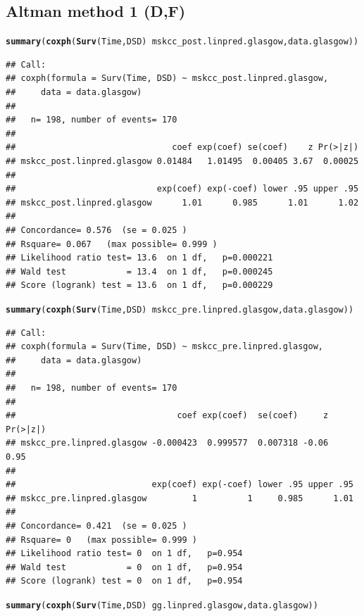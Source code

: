 \documentclass{article}\usepackage[]{graphicx}\usepackage[]{color}
\makeatletter
\newcommand{\hlopt}[1]{\textcolor[rgb]{0,0,0}{#1}}%
\newcommand{\hlstd}[1]{\textcolor[rgb]{0.345,0.345,0.345}{#1}}%
\newcommand{\hlkwd}[1]{\textcolor[rgb]{0.737,0.353,0.396}{\textbf{#1}}}%
\newenvironment{kframe}{%
 \def\at@end@of@kframe{}%
 \ifinner\ifhmode%
  \def\at@end@of@kframe{\end{minipage}}%
  \begin{minipage}{\columnwidth}%
 \fi\fi%
 \def\FrameCommand##1{\hskip\@totalleftmargin \hskip-\fboxsep
 \colorbox{shadecolor}{##1}\hskip-\fboxsep
     \hskip-\linewidth \hskip-\@totalleftmargin \hskip\columnwidth}%
 \MakeFramed {\advance\hsize-\width
   \@totalleftmargin\z@ \linewidth\hsize
   \@setminipage}}%
 {\par\unskip\endMakeFramed%
 \at@end@of@kframe}
\newenvironment{knitrout}{}{} %
\makeatother
\begin{document}
\subsection{Altman method 1 (D,F)}
\begin{knitrout}
\color{fgcolor}\begin{kframe}
\begin{alltt}
\hlkwd{summary}\hlstd{(}\hlkwd{coxph}\hlstd{(}\hlkwd{Surv}\hlstd{(Time, DSD)} \hlopt{~} \hlstd{mskcc_post.linpred.glasgow, data.glasgow))}
\end{alltt}
\begin{verbatim}
## Call:
## coxph(formula = Surv(Time, DSD) ~ mskcc_post.linpred.glasgow, 
##     data = data.glasgow)
## 
##   n= 198, number of events= 170 
## 
##                               coef exp(coef) se(coef)    z Pr(>|z|)
## mskcc_post.linpred.glasgow 0.01484   1.01495  0.00405 3.67  0.00025
## 
##                            exp(coef) exp(-coef) lower .95 upper .95
## mskcc_post.linpred.glasgow      1.01      0.985      1.01      1.02
## 
## Concordance= 0.576  (se = 0.025 )
## Rsquare= 0.067   (max possible= 0.999 )
## Likelihood ratio test= 13.6  on 1 df,   p=0.000221
## Wald test            = 13.4  on 1 df,   p=0.000245
## Score (logrank) test = 13.6  on 1 df,   p=0.000229
\end{verbatim}
\begin{alltt}
\hlkwd{summary}\hlstd{(}\hlkwd{coxph}\hlstd{(}\hlkwd{Surv}\hlstd{(Time, DSD)} \hlopt{~} \hlstd{mskcc_pre.linpred.glasgow, data.glasgow))}
\end{alltt}
\begin{verbatim}
## Call:
## coxph(formula = Surv(Time, DSD) ~ mskcc_pre.linpred.glasgow, 
##     data = data.glasgow)
## 
##   n= 198, number of events= 170 
## 
##                                coef exp(coef)  se(coef)     z Pr(>|z|)
## mskcc_pre.linpred.glasgow -0.000423  0.999577  0.007318 -0.06     0.95
## 
##                           exp(coef) exp(-coef) lower .95 upper .95
## mskcc_pre.linpred.glasgow         1          1     0.985      1.01
## 
## Concordance= 0.421  (se = 0.025 )
## Rsquare= 0   (max possible= 0.999 )
## Likelihood ratio test= 0  on 1 df,   p=0.954
## Wald test            = 0  on 1 df,   p=0.954
## Score (logrank) test = 0  on 1 df,   p=0.954
\end{verbatim}
\begin{alltt}
\hlkwd{summary}\hlstd{(}\hlkwd{coxph}\hlstd{(}\hlkwd{Surv}\hlstd{(Time, DSD)} \hlopt{~} \hlstd{gg.linpred.glasgow, data.glasgow))}

\end{alltt}
\end{kframe}
\end{knitrout}
\end{document}
